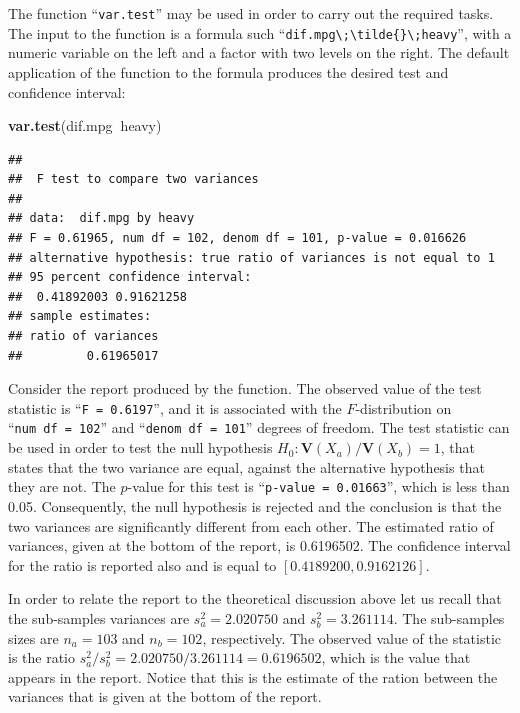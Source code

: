 \documentclass[]{krantz}
\makeatletter
\newenvironment{Shaded}{\begin{snugshade}}{\end{snugshade}}
\newcommand{\KeywordTok}[1]{\textcolor[rgb]{0.13,0.29,0.53}{\textbf{#1}}}
\newcommand{\NormalTok}[1]{#1}
\newcommand{\OperatorTok}[1]{\textcolor[rgb]{0.81,0.36,0.00}{\textbf{#1}}}
\newcommand{\Var}{\mathbf{V}}
\newenvironment{kframe}{%
\medskip{}
\setlength{\fboxsep}{.8em}
 \def\at@end@of@kframe{}%
 \ifinner\ifhmode%
  \def\at@end@of@kframe{\end{minipage}}%
  \begin{minipage}{\columnwidth}%
 \fi\fi%
 \def\FrameCommand##1{\hskip\@totalleftmargin \hskip-\fboxsep
 \colorbox{shadecolor}{##1}\hskip-\fboxsep
     \hskip-\linewidth \hskip-\@totalleftmargin \hskip\columnwidth}%
 \MakeFramed {\advance\hsize-\width
   \@totalleftmargin\z@ \linewidth\hsize
   \@setminipage}}%
 {\par\unskip\endMakeFramed%
 \at@end@of@kframe}
\renewenvironment{Shaded}{\begin{kframe}}{\end{kframe}}
\theoremstyle{definition}
\theoremstyle{definition}
\theoremstyle{definition}
\theoremstyle{remark}
\makeatother
\begin{document}
The function ``\texttt{var.test}'' may be used in order to carry out the required
tasks. The input to the function is a formula such
``\texttt{dif.mpg\textbackslash{};\textbackslash{}tilde\{\}\textbackslash{};heavy}'', with a numeric variable on the left and a
factor with two levels on the right. The default application of the
function to the formula produces the desired test and confidence
interval:

\begin{Shaded}
\begin{Highlighting}[]
\KeywordTok{var.test}\NormalTok{(dif.mpg}\OperatorTok{~}\NormalTok{heavy)}
\end{Highlighting}
\end{Shaded}

\begin{verbatim}
## 
##  F test to compare two variances
## 
## data:  dif.mpg by heavy
## F = 0.61965, num df = 102, denom df = 101, p-value = 0.016626
## alternative hypothesis: true ratio of variances is not equal to 1
## 95 percent confidence interval:
##  0.41892003 0.91621258
## sample estimates:
## ratio of variances 
##         0.61965017
\end{verbatim}

Consider the report produced by the function. The observed value of the
test statistic is ``\texttt{F\ =\ 0.6197}'', and it is associated with the
\(F\)-distribution on ``\texttt{num\ df\ =\ 102}'' and ``\texttt{denom\ df\ =\ 101}'' degrees of
freedom. The test statistic can be used in order to test the null
hypothesis \(H_0: \Var(X_a)/\Var(X_b) = 1\), that states that the two
variance are equal, against the alternative hypothesis that they are
not. The \(p\)-value for this test is ``\texttt{p-value\ =\ 0.01663}'', which is less
than 0.05. Consequently, the null hypothesis is rejected and the
conclusion is that the two variances are significantly different from
each other. The estimated ratio of variances, given at the bottom of the
report, is 0.6196502. The confidence interval for the ratio is reported
also and is equal to \([0.4189200, 0.9162126]\).

In order to relate the report to the theoretical discussion above let us
recall that the sub-samples variances are \(s^2_a = 2.020750\) and
\(s_b^2 = 3.261114\). The sub-samples sizes are \(n_a = 103\) and
\(n_b = 102\), respectively. The observed value of the statistic is the
ratio \(s_a^2/s_b^2 = 2.020750/3.261114 = 0.6196502\), which is the value
that appears in the report. Notice that this is the estimate of the
ration between the variances that is given at the bottom of the report.
\end{document}
